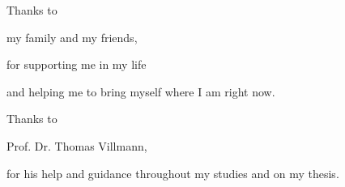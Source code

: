 \vfill
{\Large
\centerline{Thanks to}
\vspace{5pt}

\centerline{my family and my friends,}

\centerline{for supporting me in my life}
\centerline{and helping me to bring myself where I am right now.}
\vspace{20pt}

\centerline{Thanks to}
\vspace{5pt}

\centerline{Prof. Dr. Thomas Villmann,}

\centerline{for his help and guidance throughout my studies and on my thesis.}}
\vfill